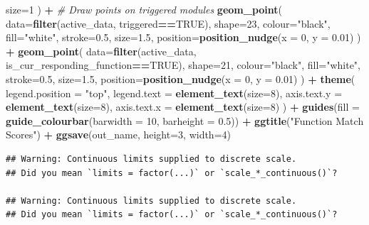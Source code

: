 \documentclass[
]{book}
\newenvironment{Shaded}{\begin{snugshade}}{\end{snugshade}}
\newcommand{\CommentTok}[1]{\textcolor[rgb]{0.56,0.35,0.01}{\textit{#1}}}
\newcommand{\DataTypeTok}[1]{\textcolor[rgb]{0.13,0.29,0.53}{#1}}
\newcommand{\DecValTok}[1]{\textcolor[rgb]{0.00,0.00,0.81}{#1}}
\newcommand{\FloatTok}[1]{\textcolor[rgb]{0.00,0.00,0.81}{#1}}
\newcommand{\KeywordTok}[1]{\textcolor[rgb]{0.13,0.29,0.53}{\textbf{#1}}}
\newcommand{\NormalTok}[1]{#1}
\newcommand{\OperatorTok}[1]{\textcolor[rgb]{0.81,0.36,0.00}{\textbf{#1}}}
\newcommand{\OtherTok}[1]{\textcolor[rgb]{0.56,0.35,0.01}{#1}}
\newcommand{\StringTok}[1]{\textcolor[rgb]{0.31,0.60,0.02}{#1}}
\begin{document}
\begin{Shaded}
\begin{Highlighting}[]
    \DataTypeTok{size=}\DecValTok{1}
\NormalTok{  ) }\OperatorTok{+}
\StringTok{  }\CommentTok{\# Draw points on triggered modules}
\StringTok{  }\KeywordTok{geom\_point}\NormalTok{(}
    \DataTypeTok{data=}\KeywordTok{filter}\NormalTok{(active\_data, triggered}\OperatorTok{==}\OtherTok{TRUE}\NormalTok{),}
    \DataTypeTok{shape=}\DecValTok{23}\NormalTok{,}
    \DataTypeTok{colour=}\StringTok{"black"}\NormalTok{,}
    \DataTypeTok{fill=}\StringTok{"white"}\NormalTok{,}
    \DataTypeTok{stroke=}\FloatTok{0.5}\NormalTok{,}
    \DataTypeTok{size=}\FloatTok{1.5}\NormalTok{,}
    \DataTypeTok{position=}\KeywordTok{position\_nudge}\NormalTok{(}\DataTypeTok{x =} \DecValTok{0}\NormalTok{, }\DataTypeTok{y =} \FloatTok{0.01}\NormalTok{)}
\NormalTok{  ) }\OperatorTok{+}
\StringTok{  }\KeywordTok{geom\_point}\NormalTok{(}
    \DataTypeTok{data=}\KeywordTok{filter}\NormalTok{(active\_data, is\_cur\_responding\_function}\OperatorTok{==}\OtherTok{TRUE}\NormalTok{),}
    \DataTypeTok{shape=}\DecValTok{21}\NormalTok{,}
    \DataTypeTok{colour=}\StringTok{"black"}\NormalTok{,}
    \DataTypeTok{fill=}\StringTok{"white"}\NormalTok{,}
    \DataTypeTok{stroke=}\FloatTok{0.5}\NormalTok{,}
    \DataTypeTok{size=}\FloatTok{1.5}\NormalTok{,}
    \DataTypeTok{position=}\KeywordTok{position\_nudge}\NormalTok{(}\DataTypeTok{x =} \DecValTok{0}\NormalTok{, }\DataTypeTok{y =} \FloatTok{0.01}\NormalTok{)}
\NormalTok{  ) }\OperatorTok{+}
\StringTok{  }\KeywordTok{theme}\NormalTok{(}
    \DataTypeTok{legend.position =} \StringTok{"top"}\NormalTok{,}
    \DataTypeTok{legend.text =} \KeywordTok{element\_text}\NormalTok{(}\DataTypeTok{size=}\DecValTok{8}\NormalTok{),}
    \DataTypeTok{axis.text.y =} \KeywordTok{element\_text}\NormalTok{(}\DataTypeTok{size=}\DecValTok{8}\NormalTok{),}
    \DataTypeTok{axis.text.x =} \KeywordTok{element\_text}\NormalTok{(}\DataTypeTok{size=}\DecValTok{8}\NormalTok{)}
\NormalTok{  ) }\OperatorTok{+}
\StringTok{  }\KeywordTok{guides}\NormalTok{(}\DataTypeTok{fill =} \KeywordTok{guide\_colourbar}\NormalTok{(}\DataTypeTok{barwidth =} \DecValTok{10}\NormalTok{, }\DataTypeTok{barheight =} \FloatTok{0.5}\NormalTok{)) }\OperatorTok{+}
\StringTok{  }\KeywordTok{ggtitle}\NormalTok{(}\StringTok{"Function Match Scores"}\NormalTok{) }\OperatorTok{+}
\StringTok{  }\KeywordTok{ggsave}\NormalTok{(out\_name, }\DataTypeTok{height=}\DecValTok{3}\NormalTok{, }\DataTypeTok{width=}\DecValTok{4}\NormalTok{)}
\end{Highlighting}
\end{Shaded}

\begin{verbatim}
## Warning: Continuous limits supplied to discrete scale.
## Did you mean `limits = factor(...)` or `scale_*_continuous()`?

## Warning: Continuous limits supplied to discrete scale.
## Did you mean `limits = factor(...)` or `scale_*_continuous()`?
\end{verbatim}
\end{document}
